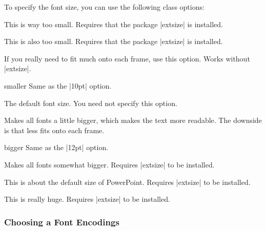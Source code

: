 To specify the font size, you can use the following class options:

\begin{classoption}{8pt}
  This is way too small. Requires that the package |extsize|
  is installed.
\end{classoption}

\begin{classoption}{9pt}
  This is also too small. Requires that the package |extsize|
  is installed.
\end{classoption}

\begin{classoption}{10pt}
  If you really need to fit much onto each frame, use this
  option. Works without |extsize|.
\end{classoption}

\begin{classoption}{smaller}
  Same as the |10pt| option.
\end{classoption}

\begin{classoption}{11pt}
  The default font size. You need not specify this option.
\end{classoption}

\begin{classoption}{12pt}
  Makes all fonts a little bigger, which makes the text more
  readable. The downside is that less fits onto each frame.
\end{classoption}

\begin{classoption}{bigger}
  Same as the |12pt| option.
\end{classoption}

\begin{classoption}{14pt}
  Makes all fonts somewhat bigger. Requires |extsize| to be installed.
\end{classoption}

\begin{classoption}{17pt}
  This is about the default size of PowerPoint. Requires |extsize| to
  be installed. 
\end{classoption}

\begin{classoption}{20pt}
  This is really huge. Requires |extsize| to be installed.
\end{classoption}



\subsubsection{Choosing a Font Encodings}
\label{section-font-encoding}

